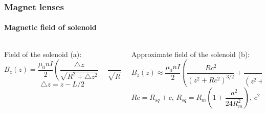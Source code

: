 \documentclass{beamer}
\begin{document}
  \begin{frame}
  \frametitle{Magnet lenses}
  \framesubtitle{Magnetic field of solenoid}
  \begin{figure}
  \label{some example}
  \end{figure}
  \begin{tiny}
\begin{columns}
  \begin{column}{0.5\textwidth}
  Field of the solenoid (a):
  \begin{equation}
B_{z}\!\left(z\right)=\!\frac{\mu_{0}nI}{2}\!\left(\!\frac{\triangle z}{\sqrt{R^{2}+\triangle z^{2}}}\!-\!\frac{\triangle z^{*}}{\sqrt{R^{2}+\triangle z^{*2}}}\!\right)\!
  \end{equation}
   \begin{equation}
\triangle z=z-L/2
  \end{equation}
  \end{column}
  \begin{column}{0.6\textwidth}
  Approximate field of the solenoid (b):
  \begin{equation}
B_{z}\left(z\right)\approx\frac{\mu_{0}nI}{2}\left(\frac{Rc^{2}}{\left(z^{2}+Rc^{2}\right)^{3/2}}+\frac{Rc^{*2}}{\left(z^{2}+Rc^{*2}\right)^{3/2}}\right)
  \end{equation}
  \begin{equation}
Rc=R_{sq}+c,\,R_{sq}=R_{m}\left(1+\frac{a^{2}}{24R_{m}^{2}}\right),\,c^{2}=\frac{b^{2}-a^{2}}{12}
  \end{equation}
  \end{column}
 \end{columns}
  \end{tiny}
  \end{frame}
\end{document}
